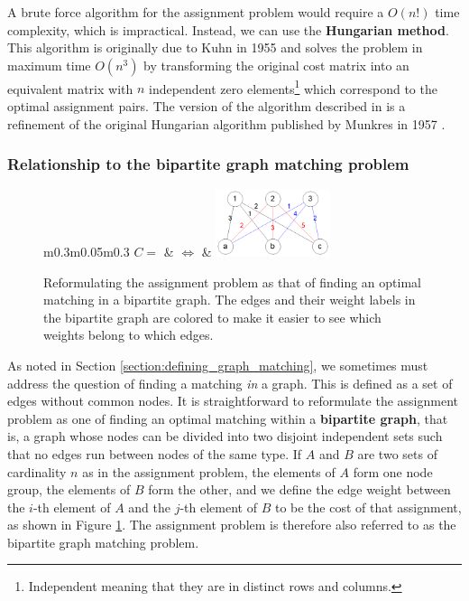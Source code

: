 \documentclass[12pt]{thesis}
\theoremstyle{plain}
\theoremstyle{definition}
\theoremstyle{remark}
\begin{document}
A brute force algorithm for the assignment problem would require a $O(n!)$ time complexity, which is impractical. Instead, we can use the \textbf{Hungarian method}. This algorithm is originally due to Kuhn in 1955 \cite{Kuhn_1955} and solves the problem in maximum time $O(n^3)$ by transforming the original cost matrix into an equivalent matrix with $n$ independent zero elements\footnote{Independent meaning that they are in distinct rows and columns.} which correspond to the optimal assignment pairs. The version of the algorithm described in \cite{Riesen_2009} is a refinement of the original Hungarian algorithm published by Munkres in 1957 \cite{munkres1957algorithms}.

\subsubsection{Relationship to the bipartite graph matching problem}

\begin{figure}[!t]
\centering
\begin{tabular}{m{}m{}m{}}
$C = $
 & $\Leftrightarrow$ &
\includegraphics[width=0.3\textwidth]{bipartite_assignment_problem.png} \\
\end{tabular}
\caption{Reformulating the assignment problem as that of finding an optimal matching in a bipartite graph. The edges and their weight labels in the bipartite graph are colored to make it easier to see which weights belong to which edges.}
\label{fig:bipartite_reformulation}
\end{figure}

As noted in Section \ref{section:defining_graph_matching}, we sometimes must address the question of finding a matching \textit{in} a graph. This is defined as a set of edges without common nodes. It is straightforward to reformulate the assignment problem as one of finding an optimal matching within a \textbf{bipartite graph}, that is, a graph whose nodes can be divided into two disjoint independent sets such that no edges run between nodes of the same type. If $A$ and $B$ are two sets of cardinality $n$ as in the assignment problem, the elements of $A$ form one node group, the elements of $B$ form the other, and we define the edge weight between the $i$-th element of $A$ and the $j$-th element of $B$ to be the cost of that assignment, as shown in Figure \ref{fig:bipartite_reformulation}. The assignment problem is therefore also referred to as the bipartite graph matching problem.
\end{document}
